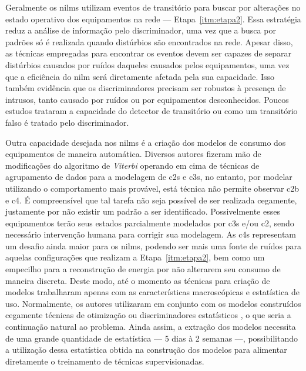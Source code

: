 Geralmente os \glspl{nilm} utilizam eventos de transitório para buscar
por alterações no estado operativo dos equipamentos na rede ---
Etapa~\ref{itm:etapa2}. Essa estratégia reduz a análise de informação
pelo discriminador, uma vez que a busca por padrões só é realizada
quando distúrbios são encontrados na rede. Apesar disso, as técnicas
empregadas para encontrar os eventos devem ser capazes de separar
distúrbios causados por ruídos daqueles causados pelos equipamentos, uma
vez que a eficiência do \gls{nilm} será diretamente afetada pela sua
capacidade. Isso também evidência que os discriminadores precisam ser
robustos à presença de intrusos, tanto causado por ruídos ou por
equipamentos desconhecidos. Poucos estudos trataram a capacidade do
detector de transitório ou como um transitório falso é tratado pelo
discriminador.

Outra capacidade desejada nos \glspl{nilm} é a criação dos modelos
de consumo dos equipamentos de maneira automática. Diversos
autores fizeram mão de modificações do algoritmo de \emph{Viterbi}
\cite{nilm_bouloutas_viterbi_ext_1991_11,
nilm_hart_fsm_viterbi_1993_12,nilm_baranski_genetic_base_2003_19,
nilm_baranski_genetic_detalhado_2004_20,nilm_baranski_summary_2004_21,
nilm_bergman_distribuido_2011,nilm_zeifman_vast_2011,
nilm_zeifman_vastext_approach_2012,
nilm_zeifman_statistical_vastext_1stws_2012,
seminilm_fhmm_empiricalnmeter_2013}
operando em cima de técnicas de agrupamento de dados para a modelagem
de \glspl{c2} e \glspl{c3}, no entanto, por modelar utilizando o
comportamento mais provável, está técnica não permite observar
\gls{c2b} e \gls{c4}. É compreensível que tal tarefa não seja possível
de ser realizada cegamente, justamente por não existir um padrão a ser
identificado. Possivelmente esses equipamentos terão seus estados
parcialmente modelados por \glspl{c3} e/ou \gls{c2}, sendo necessário
intervenção humana para corrigir sua modelagem. As \glspl{c4}
representam um desafio ainda maior para os \glspl{nilm}, podendo ser
mais uma fonte de ruídos para aquelas configurações que realizam a
Etapa~\ref{itm:etapa2}, bem como um empecilho para a reconstrução de
energia por não alterarem seu consumo de maneira discreta. Deste modo,
até o momento as técnicas para criação de modelos trabalharam apenas
com as características macroscópicas e estatística de uso.
Normalmente, os autores utilizaram em conjunto com os modelos
construídos cegamente técnicas de otimização
\cite{nilm_bergman_distribuido_2011} ou discriminadores estatísticos
\cite{nilm_zeifman_vast_2011, nilm_zeifman_vastext_approach_2012,
nilm_zeifman_statistical_vastext_1stws_2012,
seminilm_fhmm_empiricalnmeter_2013}, o que seria a continuação natural
ao problema. Ainda assim, a extração dos modelos necessita de uma
grande quantidade de estatística --- 5 dias à 2 semanas ---,
possibilitando a utilização dessa estatística obtida na construção dos
modelos para alimentar diretamente o treinamento de técnicas
supervisionadas.

